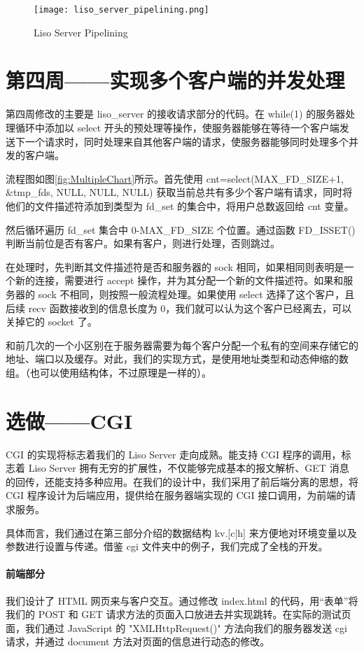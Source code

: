 \begin{figure}[htbp!]
    \centering
    \texttt{[image: liso\_server\_pipelining.png]}
    \caption{Liso Server Pipelining}\label{fig:liso_server_pipelining}
\end{figure}

\section{第四周——实现多个客户端的并发处理}

第四周修改的主要是 liso\_server 的接收请求部分的代码。在 while(1) 的服务器处理循环中添加以 select 开头的预处理等操作，使服务器能够在等待一个客户端发送下一个请求时，同时处理来自其他客户端的请求，使服务器能够同时处理多个并发的客户端。

流程图如图\ref{fig:MultipleChart}所示。首先使用 cnt=select(MAX\_FD\_SIZE+1, \&tmp\_fds, NULL, NULL, NULL) 获取当前总共有多少个客户端有请求，同时将他们的文件描述符添加到类型为 fd\_set 的集合中，将用户总数返回给 cnt 变量。

然后循环遍历 fd\_set 集合中 0-MAX\_FD\_SIZE 个位置。通过函数 FD\_ISSET() 判断当前位是否有客户。如果有客户，则进行处理，否则跳过。

在处理时，先判断其文件描述符是否和服务器的 sock 相同，如果相同则表明是一个新的连接，需要进行 accept 操作，并为其分配一个新的文件描述符。如果和服务器的 sock 不相同，则按照一般流程处理。如果使用 select 选择了这个客户，且后续 recv 函数接收到的信息长度为 0，我们就可以认为这个客户已经离去，可以关掉它的 socket 了。

和前几次的一个小区别在于服务器需要为每个客户分配一个私有的空间来存储它的地址、端口以及缓存。对此，我们的实现方式，是使用地址类型和动态伸缩的数组。（也可以使用结构体，不过原理是一样的）。

\section{选做——CGI}

CGI 的实现将标志着我们的 Liso Server 走向成熟。能支持 CGI 程序的调用，标志着 Liso Server 拥有无穷的扩展性，不仅能够完成基本的报文解析、GET 消息的回传，还能支持多种应用。在我们的设计中，我们采用了前后端分离的思想，将 CGI 程序设计为后端应用，提供给在服务器端实现的 CGI 接口调用，为前端的请求服务。

具体而言，我们通过在第三部分介绍的数据结构 kv.[c|h] 来方便地对环境变量以及参数进行设置与传递。借鉴 cgi 文件夹中的例子，我们完成了全栈的开发。
\paragraph*{前端部分} 我们设计了 HTML 网页来与客户交互。通过修改 index.html 的代码，用“表单”将我们的 POST 和 GET 请求方法的页面入口放进去并实现跳转。在实际的测试页面，我们通过 JavaScript 的 "XMLHttpRequest()" 方法向我们的服务器发送 cgi 请求，并通过 document 方法对页面的信息进行动态的修改。

